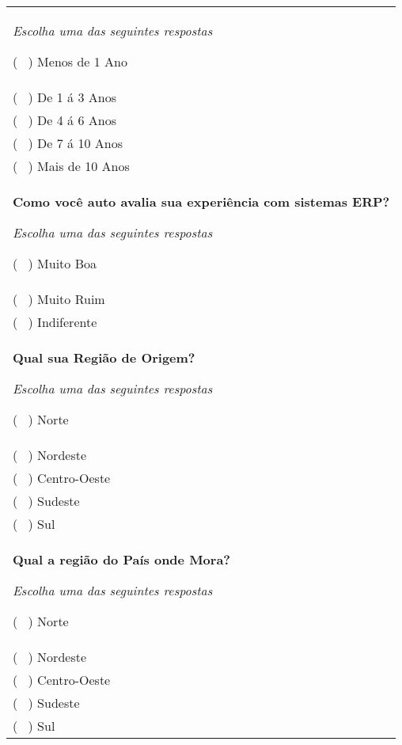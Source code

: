 \begin{longtable}{|p{15.7cm}|}
	\begin{Spacing}{2.0} 
		\tiny \textit{Escolha uma das seguintes respostas} \end{Spacing} 
	( \ ) Menos de 1 Ano \\
	( \ ) De 1 á 3 Anos \\
	( \ ) De 4 á 6 Anos \\
	( \ ) De 7 á 10 Anos \\
	( \ ) Mais de 10 Anos \\
	\begin{Spacing}{0.8} \end{Spacing}
	\begin{Spacing}{0.8} 
		\textbf{Como você auto avalia sua experiência com sistemas ERP?} \end{Spacing} 
	\begin{Spacing}{2.0} 
		\tiny \textit{Escolha uma das seguintes respostas} \end{Spacing} 
	( \ ) Muito Boa \\
	( \ ) Muito Ruim \\
	( \ ) Indiferente \\
		\begin{Spacing}{0.8} \end{Spacing}
	\begin{Spacing}{0.8} 
		\textbf{Qual sua Região de Origem?} \end{Spacing} 
	\begin{Spacing}{2.0} 
		\tiny \textit{Escolha uma das seguintes respostas} \end{Spacing} 
	( \ ) Norte \\
	( \ ) Nordeste \\
	( \ ) Centro-Oeste \\
	( \ ) Sudeste \\
	( \ ) Sul \\
	\begin{Spacing}{0.8} \end{Spacing}
	\begin{Spacing}{0.8} 
		\textbf{Qual a região do País onde Mora?} \end{Spacing} 
	\begin{Spacing}{2.0} 
		\tiny \textit{Escolha uma das seguintes respostas} \end{Spacing} 
	( \ ) Norte \\
	( \ ) Nordeste \\
	( \ ) Centro-Oeste \\
	( \ ) Sudeste \\
	( \ ) Sul \\

\end{longtable}
